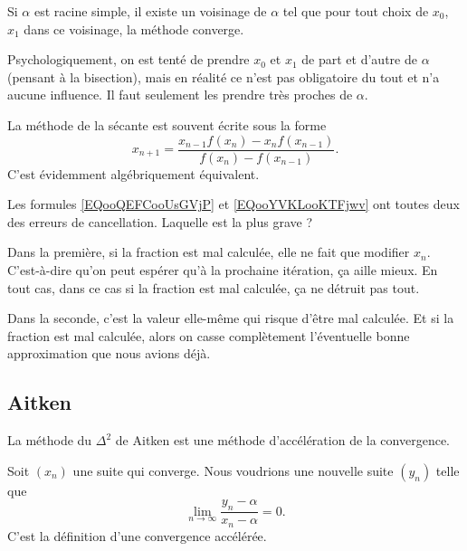 \begin{proposition}
	Si \( \alpha\) est racine simple, il existe un voisinage de \( \alpha\) tel que pour tout choix de \( x_0\), \( x_1\) dans ce voisinage, la méthode converge.
\end{proposition}

Psychologiquement, on est tenté de prendre \( x_0\) et \( x_1\) de part et d'autre de \( \alpha\) (pensant à la bisection), mais en réalité ce n'est pas obligatoire du tout et n'a aucune influence. Il faut seulement les prendre très proches de \( \alpha\).

\begin{remark}
	La méthode de la sécante est souvent écrite sous la forme
	\begin{equation}        \label{EQooYVKLooKTFjwv}
		x_{n+1}=\frac{ x_{n-1}f(x_n)-x_nf(x_{n-1}) }{ f(x_n)-f(x_{n-1}) }.
	\end{equation}
	C'est évidemment algébriquement équivalent.

	Les formules \eqref{EQooQEFCooUsGVjP} et \eqref{EQooYVKLooKTFjwv} ont toutes deux des erreurs de cancellation. Laquelle est la plus grave ?

	Dans la première, si la fraction est mal calculée, elle ne fait que modifier \( x_n\). C'est-à-dire qu'on peut espérer qu'à la prochaine itération, ça aille mieux. En tout cas, dans ce cas si la fraction est mal calculée, ça ne détruit pas tout.

	Dans la seconde, c'est la valeur elle-même qui risque d'être mal calculée. Et si la fraction est mal calculée, alors on casse complètement l'éventuelle bonne approximation que nous avions déjà.
\end{remark}

\subsection{Aitken}

La méthode du \( \Delta^2\) de Aitken est une méthode d'accélération de la convergence.

Soit \( (x_n)\) une suite qui converge. Nous voudrions une nouvelle suite \( (y_n)\) telle que
\begin{equation}
	\lim_{n\to \infty} \frac{ y_n-\alpha }{ x_n-\alpha }=0.
\end{equation}
C'est la définition d'une convergence accélérée.

